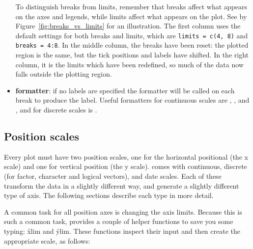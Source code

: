 \begin{itemize}
  To distinguish breaks from limits, remember that breaks affect what appears on the axes and legends, while limits affect what appears on the plot.  See by Figure~\ref{fig:breaks_vs_limits} for an illustration.  The first column uses the default settings for both breaks and limits, which are {\tt limits = c(4, 8)} and {\tt breaks = 4:8}.  In the middle column, the breaks have been reset: the plotted region is the same, but the tick positions and labels have shifted.  In the right column, it is the limits which have been redefined, so much of the data now falls outside the plotting region. 
  
    

  \item {\bf formatter}: if no labels are specified the formatter will be called on each break to produce the label.  Useful formatters for continuous scales are , ,  and , and for discrete scales is .
\end{itemize}

\subsection{Position scales}
\label{sub:scale-position}

Every plot must have two position scales, one for the horizontal positional (the x scale) and one for vertical position (the y scale). \ggplot comes with continuous, discrete (for factor, character and logical vectors), and date scales. Each of these transform the data in a slightly different way, and generate a slightly different type of axis. The following sections describe each type in more detail.

A common task for all position axes is changing the axis limits.  Because this is such a common task, \ggplot provides a couple of helper functions to save you some typing: \f{xlim} and \f{ylim}.  These functions inspect their input and then create the appropriate scale, as follows:

